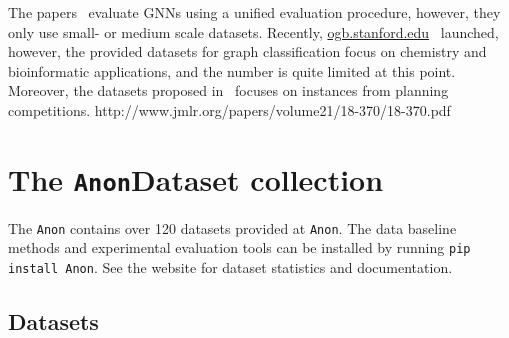 \documentclass{article}
\theoremstyle{definition}
\begin{document}
The papers~\cite{Fey+2019,Che+2019new,Err+2019,Dwi+2020} evaluate GNNs using a unified evaluation procedure, however, they only use small- or medium scale datasets. Recently, \url{ogb.stanford.edu}~\cite{Hu+2020} launched, however, the provided datasets for graph classification focus on chemistry and bioinformatic applications, and the number is quite limited at this point. Moreover, the datasets proposed in~\cite{Fer+2019} focuses on instances from planning competitions. http://www.jmlr.org/papers/volume21/18-370/18-370.pdf

\section{The \texttt{Anon}Dataset collection}

The \texttt{Anon} contains over 120 datasets provided at \texttt{Anon}. The data baseline methods and experimental evaluation tools can be installed by running \texttt{pip install Anon}. See the website for dataset statistics and documentation.

\subsection{Datasets}
\end{document}
